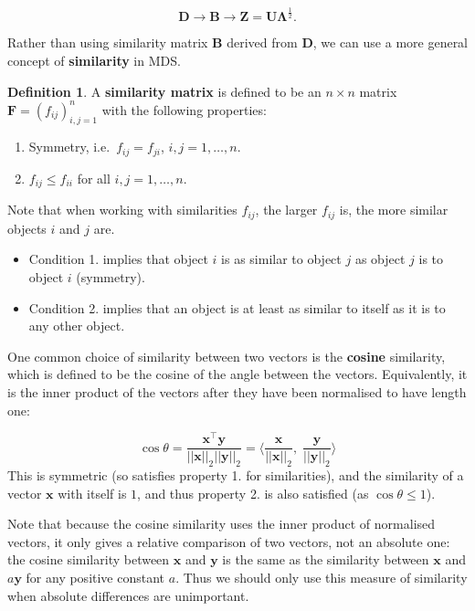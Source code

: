 \documentclass[
]{book}
\providecommand{\tightlist}{%
  \setlength{\itemsep}{0pt}\setlength{\parskip}{0pt}}
\theoremstyle{definition}
\newtheorem{definition}{Definition}[chapter]
\theoremstyle{definition}
\theoremstyle{definition}
\theoremstyle{definition}
\theoremstyle{remark}
\begin{document}
\[\mathbf D\longrightarrow \mathbf B\longrightarrow \mathbf Z=\mathbf U\boldsymbol \Lambda^{\frac{1}{2}}.\]

Rather than using similarity matrix \(\mathbf B\) derived from \(\mathbf D\), we can use a more general concept of \textbf{similarity} in MDS.

\begin{definition}
\protect\hypertarget{def:unnamed-chunk-20}{}{\label{def:unnamed-chunk-20} }A \textbf{similarity matrix} is defined to be an \(n \times n\) matrix \({\mathbf F}=(f_{ij})_{i,j=1}^n\) with the following properties:

\begin{enumerate}
\def\labelenumi{\arabic{enumi}.}
\tightlist
\item
  Symmetry, i.e.~\(f_{ij} =f_{ji}\), \(i,j=1, \ldots , n\).
\item
  \(f_{ij} \leq f_{ii}\) for all \(i,j=1, \ldots , n\).
\end{enumerate}
\end{definition}

Note that when working with similarities \(f_{ij}\), the larger \(f_{ij}\) is, the more similar objects \(i\) and \(j\) are.

\begin{itemize}
\item
  Condition 1. implies that object \(i\) is as similar to object \(j\) as object \(j\) is to object \(i\) (symmetry).
\item
  Condition 2. implies that an object is at least as similar to itself as it is to any other object.
\end{itemize}

One common choice of similarity between two vectors is the \textbf{cosine} similarity, which is defined to be the cosine of the angle between the vectors. Equivalently, it is the inner product of the vectors after they have been normalised to have length one:

\[\cos \theta = \frac{\mathbf x^\top \mathbf y}{||\mathbf x||_2 ||\mathbf y||_2}=\langle \frac{\mathbf x}{||\mathbf x||_2}, \; \frac{\mathbf y}{||\mathbf y||_2}\rangle\]
This is symmetric (so satisfies property 1. for similarities), and the similarity of a vector \(\mathbf x\) with itself is \(1\), and thus property 2. is also satisfied (as \(\cos \theta \leq 1\)).

Note that because the cosine similarity uses the inner product of normalised vectors, it only gives a relative comparison of two vectors, not an absolute one: the cosine similarity between \(\mathbf x\) and \(\mathbf y\) is the same as the similarity between \(\mathbf x\) and \(a\mathbf y\) for any positive constant \(a\). Thus we should only use this measure of similarity when absolute differences are unimportant.
\end{document}
